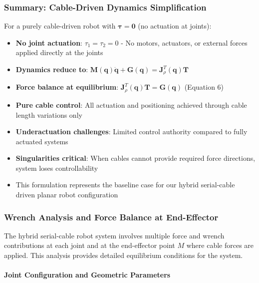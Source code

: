 \subsubsection{Summary: Cable-Driven Dynamics Simplification}

For a purely cable-driven robot with $\boldsymbol{\tau} = \mathbf{0}$ (no actuation at joints):

\begin{itemize}
    \item \textbf{No joint actuation}: $\tau_1 = \tau_2 = 0$ - No motors, actuators, or external forces applied directly at the joints
    
    \item \textbf{Dynamics reduce to}: $\mathbf{M}(\mathbf{q}) \ddot{\mathbf{q}} + \mathbf{G}(\mathbf{q}) = \mathbf{J}_{\rho}^T(\mathbf{q}) \mathbf{T}$
    
    \item \textbf{Force balance at equilibrium}: $\mathbf{J}_{\rho}^T(\mathbf{q}) \mathbf{T} = \mathbf{G}(\mathbf{q})$ (Equation 6)
    
    \item \textbf{Pure cable control}: All actuation and positioning achieved through cable length variations only
    
    \item \textbf{Underactuation challenges}: Limited control authority compared to fully actuated systems
    
    \item \textbf{Singularities critical}: When cables cannot provide required force directions, system loses controllability
    
    \item This formulation represents the baseline case for our hybrid serial-cable driven planar robot configuration
\end{itemize}

\subsubsection{Wrench Analysis and Force Balance at End-Effector}

The hybrid serial-cable robot system involves multiple force and wrench contributions at each joint and at the end-effector point $M$ where cable forces are applied. This analysis provides detailed equilibrium conditions for the system.

\paragraph{Joint Configuration and Geometric Parameters}


